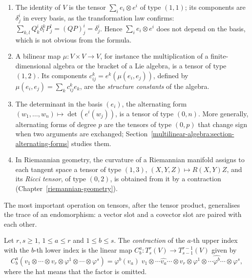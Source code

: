 \begin{example}\label{multilinear-algebra:example-tensors}
\begin{enumerate}
\item The identity of $V$ is the tensor $\sum_ie_i \otimes e^i$ of type $(1,1)$; its components are $\delta^i_j$ in every basis, as the transformation law confirms:
$\sum_{k,l}Q^i_k\delta^k_lP^l_j = (QP)^i_j = \delta^i_j$. Hence $\sum_ie_i \otimes e^i$ does not depend on the basis, which is not obvious from the formula.
\item A bilinear map $\mu \colon V \times V \to V$, for instance the multiplication of a finite-dimensional algebra or the bracket of a Lie algebra, is a tensor of type $(1,2)$.
Its components $c^k_{ij} = e^k(\mu(e_i, e_j))$, defined by $\mu(e_i, e_j) = \sum_kc^k_{ij}e_k$, are the \emph{structure constants} of the algebra.
\item The determinant in the basis $(e_i)$, the alternating form $(w_1, \ldots, w_n) \mapsto \det(e^i(w_j))$, is a tensor of type $(0,n)$. More generally, alternating forms of degree $p$
are the tensors of type $(0,p)$ that change sign when two arguments are exchanged; Section~\ref{multilinear-algebra:section-alternating-forms} studies them.
\item In Riemannian geometry, the curvature of a Riemannian manifold assigns to each tangent space a tensor of type $(1,3)$, $(X, Y, Z) \mapsto R(X, Y)Z$, and its \emph{Ricci tensor}, of type $(0,2)$,
is obtained from it by a contraction (Chapter~\ref{riemannian-geometry}).
\end{enumerate}
\end{example}

The most important operation on tensors, after the tensor product, generalises the trace of an endomorphism: a vector slot and a covector slot are paired with each other.

\begin{definition}\label{multilinear-algebra:definition-contraction}
Let $r, s \geq 1$, $1 \leq a \leq r$ and $1 \leq b \leq s$. The \emph{contraction} of the $a$-th upper index with the $b$-th lower index is the linear map
$C^a_b \colon T^r_s(V) \to T^{r-1}_{s-1}(V)$ given by
\[
C^a_b(v_1 \otimes \cdots \otimes v_r \otimes \varphi^1 \otimes \cdots \otimes \varphi^s) = \varphi^b(v_a)\; v_1 \otimes \cdots \widehat{v_a} \cdots \otimes v_r \otimes \varphi^1 \otimes \cdots
\widehat{\varphi^b} \cdots \otimes \varphi^s,
\]
where the hat means that the factor is omitted.
\end{definition}

